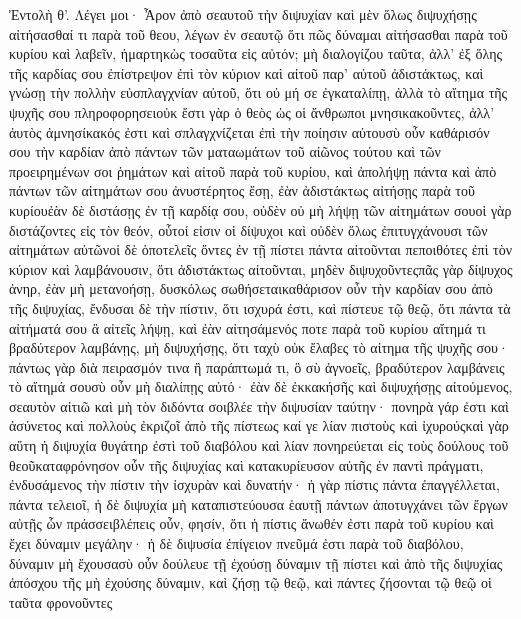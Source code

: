 Ἐντολὴ θ’.
Λέγει μοι· Ἆρον ἀπὸ σεαυτοῦ τὴν διψυχίαν καὶ μὲν ὅλως διψυχήσῃς αἰτήσασθαί τι παρὰ τοῦ θεου, λέγων ἐν σεαυτῷ ὅτι πῶς δύναμαι αἰτήσασθαι παρὰ τοῦ κυρίου καὶ λαβεῖν, ἡμαρτηκὼς τοσαῦτα εἰς αὐτόν; μὴ διαλογίζου ταῦτα, ἀλλ’ ἐξ ὅλης τῆς καρδίας σου ἐπίστρεψον ἐπὶ τὸν κύριον καὶ αἰτοῦ παρ’ αὐτοῦ ἀδιστάκτως, καὶ γνώσῃ τὴν πολλὴν εὐσπλαγχνίαν αὐτοῦ, ὅτι οὐ μή σε ἐγκαταλίπῃ, ἀλλὰ τὸ αἴτημα τῆς ψυχῆς σου πληροφορησειοὐκ ἔστι γὰρ ὁ θεὸς ὡς οἱ ἄνθρωποι μνησικακοῦντες, ἀλλ’ ἀυτὸς ἀμνησίκακός ἐστι καὶ σπλαγχνίζεται ἐπὶ τὴν ποίησιν αὐτουσὺ οὖν καθάρισόν σου τὴν καρδίαν ἀπὸ πάντων τῶν ματαωμάτων τοῦ αἰῶνος τούτου καὶ τῶν προειρημένων σοι ῥημάτων καὶ αἰτοῦ παρὰ τοῦ κυρίου, καὶ ἀπολήψῃ πάντα καὶ ἀπὸ πάντων τῶν αἰτημάτων σου ἀνυστέρητος ἔσῃ, ἐὰν ἀδιστάκτως αἰτήσῃς παρὰ τοῦ κυρίουἐὰν δὲ διστάσῃς ἐν τῇ καρδίᾳ σου, οὐδὲν οὐ μὴ λήψῃ τῶν αἰτημάτων σουοἱ γὰρ διστάζοντες εἰς τὸν θεόν, οὗτοί εἰσιν οἱ δίψυχοι καὶ οὐδὲν ὅλως ἐπιτυγχάνουσι τῶν αἰτημάτων αὐτῶνοἱ δὲ ὁποτελεῖς ὄντες ἐν τῇ πίστει πάντα αἰτοῦνται πεποιθότες ἐπὶ τὸν κύριον καὶ λαμβάνουσιν, ὅτι ἀδιστάκτως αἰτοῦνται, μηδὲν διψυχοῦντεςπᾶς γὰρ δίψυχος ἀνηρ, ἐὰν μὴ μετανοήσῃ, δυσκόλως σωθήσεταικαθάρισον οὖν τὴν καρδίαν σου ἀπὸ τῆς διψυχίας, ἔνδυσαι δὲ τὴν πίστιν, ὅτι ισχυρά ἐστι, καὶ πίστευε τῷ θεῷ, ὅτι πάντα τὰ αἰτήματά σου ἃ αἰτεῖς λήψῃ, καὶ ἐὰν αἰτησάμενός ποτε παρὰ τοῦ κυρίου αἴτημά τι βραδύτερον λαμβάνῃς, μὴ διψυχήσῃς, ὅτι ταχὺ οὐκ ἔλαβες τὸ αἰτημα τῆς ψυχῆς σου· πάντως γὰρ διὰ πειρασμόν τινα ἢ παράπτωμά τι, ὃ σὺ ἀγνοεῖς, βραδύτερον λαμβάνεις τὸ αἴτημά σουσὺ οὖν μὴ διαλίπῃς αὐτό· ἐὰν δὲ ἐκκακήσῆς καὶ διψυχήσῃς αἰτούμενος, σεαυτὸν αἰτιῶ καὶ μὴ τὸν διδόντα σοιβλέε τὴν διψυσίαν ταύτην· πονηρὰ γάρ ἐστι καὶ ἀσύνετος καὶ πολλοὺς ἐκριζοῖ ἀπὸ τῆς πίστεως καί γε λίαν πιστοὺς καὶ ἰχυρούςκαὶ γὰρ αὕτη ἡ διψυχία θυγάτηρ ἐστὶ τοῦ διαβόλου καὶ λίαν πονηρεύεται εἰς τοὺς δούλους τοῦ θεοῦκαταφρόνησον οὖν τῆς διψυχίας καὶ κατακυρίευσον αὐτῆς ἐν παντὶ πράγματι, ἐνδυσάμενος τὴν πίστιν τὴν ἰσχυρὰν καὶ δυνατήν· ἡ γὰρ πίστις πάντα ἐπαγγέλλεται, πάντα τελειοῖ, ἡ δὲ διψυχία μὴ καταπιστεύουσα ἑαυτῇ πάντων ἀποτυγχάνει τῶν ἔργων αὐτῇς ὧν πράσσειβλέπεις οὖν, φησίν, ὅτι ἡ πίστις ἄνωθέν ἐστι παρὰ τοῦ κυρίου καὶ ἔχει δύναμιν μεγάλην· ἡ δὲ διψυσία ἐπίγειον πνεῦμά ἐστι παρὰ τοῦ διαβόλου, δύναμιν μὴ ἔχουσασὺ οὖν δούλευε τῇ ἐχούσῃ δύναμιν τῇ πίστει καὶ ἀπὸ τῆς διψυχίας ἀπόσχου τῆς μὴ ἐχούσης δύναμιν, καὶ ζήσῃ τῷ θεῷ, καὶ πάντες ζήσονται τῷ θεῷ οἱ ταῦτα φρονοῦντες

